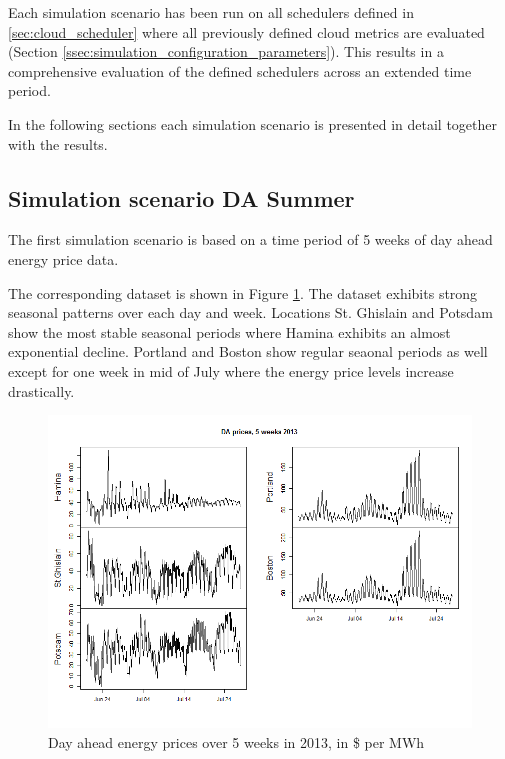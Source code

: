 Each simulation scenario has been run on all schedulers defined in \ref{sec:cloud_scheduler} where all previously defined cloud metrics are evaluated (Section \ref{ssec:simulation_configuration_parameters}). This results in a comprehensive evaluation of the defined schedulers across an extended time period. 

In the following sections each simulation scenario is presented in detail together with the results. 



\subsection{Simulation scenario DA Summer} \label{ssec:simulation_scenario_da_summer}

The first simulation scenario is based on a time period of 5 weeks of day ahead energy price data. 

The corresponding dataset is shown in Figure \ref{fig:da_sim_2013_5weeks}. The dataset exhibits strong seasonal patterns over each day and week. Locations St. Ghislain and Potsdam show the most stable seasonal periods where Hamina exhibits an almost exponential decline. Portland and Boston show regular seaonal periods as well except for one week in mid of July where the energy price levels increase drastically. 

\begin{figure}[htbp]
	\centering
	\vspace*{-0.4in}
		\includegraphics[width=1.0\textwidth]{figures/evaluation_and_results/da_sim_2013_5weeks.png}
	\caption{Day ahead energy prices over 5 weeks in 2013, in \$ per MWh}
	\label{fig:da_sim_2013_5weeks}
\end{figure}

